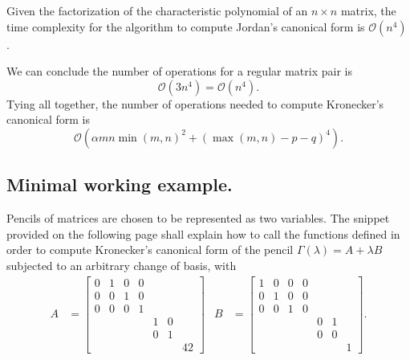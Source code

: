 \begin{remark}
    Given the factorization of the characteristic polynomial of an \(n \times n\) matrix, the time complexity
    for the algorithm to compute Jordan's canonical form is \(\mathcal{O}(n^4)\)
    \cite{DBLP:journals/corr/abs-cs-0412005}.
\end{remark}

We can conclude the number of operations for a regular matrix pair is
\[
    \mathcal{O}(3n^4) = \mathcal{O}(n^4).
\]
Tying all together, the number of operations needed to compute Kronecker's canonical form is
\[
    \mathcal{O}(\alpha mn \min(m, n)^2 + (\max(m, n) - p - q)^4).
\]

\subsection*{Minimal working example.}
Pencils of matrices are chosen to be represented as two variables. The snippet provided on the following page
shall explain how to call the functions defined in order to compute Kronecker's canonical form of the pencil
\(\Gamma(\lambda) = A + \lambda B\) subjected to an arbitrary change of basis, with
\begin{align*}
    A &=
    \begin{bmatrix}
        0 & 1 & 0 & 0 \\
        0 & 0 & 1 & 0 \\
        0 & 0 & 0 & 1 \\
        & & & & 1 & 0 \\
        & & & & 0 & 1 \\
        & & & & & & 42
    \end{bmatrix} &
    B &=
    \begin{bmatrix}
        1 & 0 & 0 & 0 \\
        0 & 1 & 0 & 0 \\
        0 & 0 & 1 & 0 \\
        & & & & 0 & 1 \\
        & & & & 0 & 0 \\
        & & & & & & 1
    \end{bmatrix}.
\end{align*}
\pagebreak
